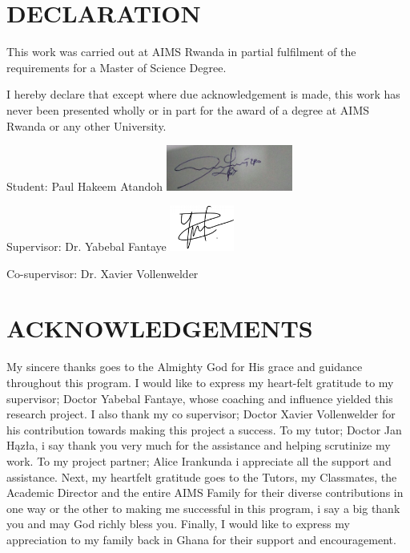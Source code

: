\chapter*{DECLARATION}
This work was carried out at AIMS Rwanda in partial fulfilment of the requirements for a Master of Science Degree.

I hereby declare that except where due acknowledgement is made, this work has never been presented wholly or in part for the award of a degree at AIMS Rwanda or any other University.

\vspace{1.5cm}
Student: Paul Hakeem Atandoh \includegraphics[height=1.5cm]{images/Signature.png}

\vspace{1.5cm}

Supervisor: Dr. Yabebal  Fantaye \includegraphics[height=1.5cm]{images/SIGNATURE.png}

Co-supervisor: Dr. Xavier Vollenwelder

\newpage

\chapter*{ACKNOWLEDGEMENTS}
My sincere thanks goes to the Almighty God for His grace and guidance throughout this program. I would like to express my heart-felt gratitude to my supervisor; Doctor Yabebal Fantaye, whose coaching and influence yielded this research project. I also thank my co supervisor; Doctor Xavier Vollenwelder for his contribution towards making this project a success.
To my tutor; Doctor Jan H{\k{a}}z{\l}a, i say thank you very much for the assistance and helping scrutinize my work. To my project partner; Alice Irankunda i appreciate all the support and assistance.  Next, my heartfelt gratitude goes to the Tutors, my Classmates, the Academic Director and the entire AIMS Family for their diverse contributions in one way or the other to making me successful in this program, i say a big thank you and may God richly bless you.
Finally, I would like to express my appreciation to my family back in Ghana for their support and encouragement.
%
